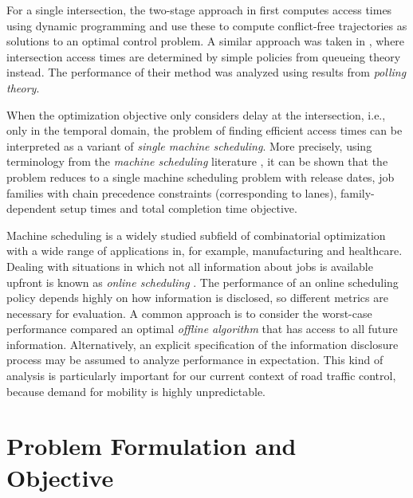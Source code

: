 \documentclass{article}
\begin{document}

For a single intersection, the two-stage approach in \cite{feng_spatiotemporal_2018} first computes
access times using dynamic programming and use these to compute conflict-free
trajectories as solutions to an optimal control problem. A similar approach was
taken in \cite{timmerman_platoon_2021}, where intersection access times are determined by
simple policies from queueing theory instead. The performance of their method
was analyzed using results from \textit{polling theory}.


When the optimization objective only considers delay at the intersection, i.e.,
only in the temporal domain, the problem of finding efficient access times can
be interpreted as a variant of \textit{single machine scheduling}. More
precisely, using terminology from the \textit{machine scheduling} literature
\cite{pinedo_scheduling_2016}, it can be shown that the problem reduces to a
single machine scheduling problem with release dates, job families with chain
precedence constraints (corresponding to lanes), family-dependent setup times
and total completion time objective.


Machine scheduling is a widely studied subfield of combinatorial optimization
with a wide range of applications in, for example, manufacturing and healthcare.
Dealing with situations in which not all information about jobs is available
upfront is known as \textit{online scheduling} \cite{guerreiro_online_2023, vestjens_-line_1997}. The
performance of an online scheduling policy depends highly on how information is
disclosed, so different metrics are necessary for evaluation. A common approach
is to consider the worst-case performance  compared an optimal \textit{offline
algorithm} that has access to all future information. Alternatively, an explicit
specification of the information disclosure process may be assumed to analyze
performance in expectation. This kind of analysis is particularly important for
our current context of road traffic control, because demand for mobility is
highly unpredictable.


\section{Problem Formulation and Objective}
\end{document}
